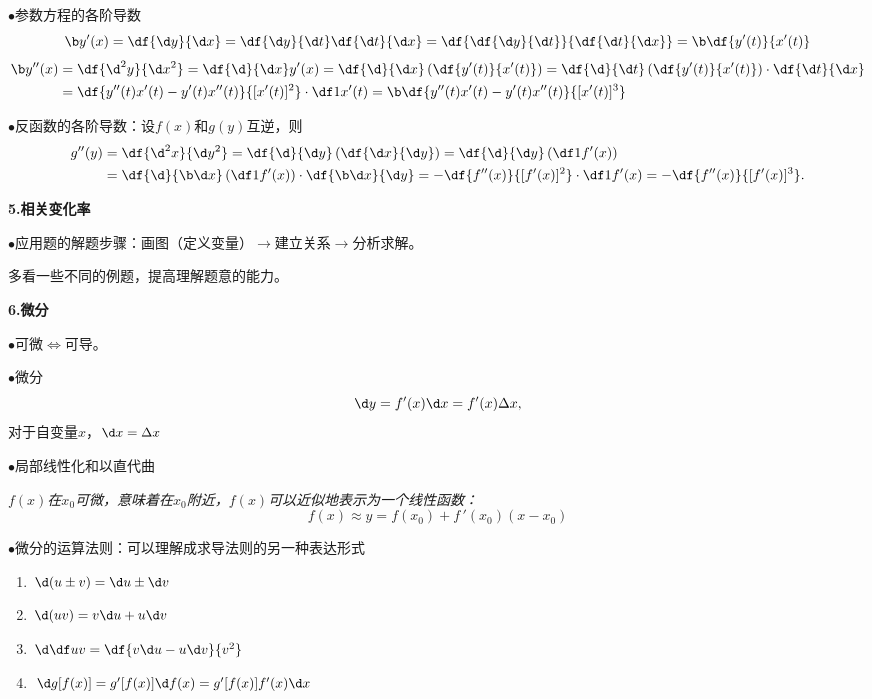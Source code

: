 $\bullet$参数方程的各阶导数
$${\b y'(x)}=\df{\d y}{\d x}=\df{\d y}{\d t}\df{\d t}{\d x}
=\df{\df{\d y}{\d t}}{\df{\d t}{\d x}}={\b \df{y'(t)}{x'(t)}}$$
\begin{align*}
	{\b y''(x)}&=\df{\d^2y}{\d x^2}=\df{\d}{\d x}y'(x)
	=\df{\d}{\d x}\left(\df{y'(t)}{x'(t)}\right)
	=\df{\d}{\d t}\left(\df{y'(t)}{x'(t)}\right)\cdot\df{\d t}{\d x}\\
	&=\df{y''(t)x'(t)-y'(t)x''(t)}{[x'(t)]^2}\cdot\df1{x'(t)}
	={\b \df{y''(t)x'(t)-y'(t)x''(t)}{[x'(t)]^3}}
\end{align*}

$\bullet$反函数的各阶导数：设$f(x)$和$g(y)$互逆，则
\begin{align*}
	g''(y)&=\df{\d^2x}{\d y^2}
	=\df{\d }{\d y}\left(\df{\d x}{\d y}\right)
	=\df{\d }{\d y}\left(\df1{f'(x)}\right)\\
	&=\df{\d }{\b\d x}\left(\df1{f'(x)}\right)\cdot\df{\b\d x}{\d y}
	=-\df{f''(x)}{[f'(x)]^2}\cdot\df1{f'(x)}
	=-\df{f''(x)}{[f'(x)]^3}.
\end{align*}

{\bf 5.相关变化率}

$\bullet$应用题的解题步骤：画图（定义变量）$\to$建立关系$\to$分析求解。

多看一些不同的例题，提高理解题意的能力。

{\bf 6.微分}

$\bullet$可微$\Leftrightarrow$可导。

$\bullet$微分
$$\d y=f'(x)\d x=f'(x)\Delta x,$$
对于自变量$x$，$\d x=\Delta x$

$\bullet$局部线性化和以直代曲
\begin{center}

	\it $f(x)$在$x_0$可微，意味着在$x_0$附近，$f(x)$可以近似地表示为一个线性函数： 
	$$f(x)\approx y= f(x_0)+f\,'(x_0)(x-x_0)$$
\end{center}

$\bullet$微分的运算法则：可以理解成求导法则的另一种表达形式
\begin{enumerate}[(1)]
  \setlength{\itemindent}{1cm}
  \item $\d (u\pm v)=\d u\pm \d v$
  \item $\d(uv)=v\d u+u\d v$
  \item $\d\df uv=\df{v\d u-u\d v}{v^2}$
  \item $\d g[f(x)]=g'[f(x)]\d f(x)=g'[f(x)]f'(x)\d x$
\end{enumerate}

\fi